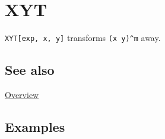 \documentclass[../FeynCalcManual.tex]{subfiles}
\begin{document}
\hypertarget{xyt}{%
\section{XYT}\label{xyt}}

\texttt{XYT[\allowbreak{}exp,\ \allowbreak{}x,\ \allowbreak{}y]}
transforms \texttt{(x y)^m} away.

\subsection{See also}

\hyperlink{toc}{Overview}

\subsection{Examples}
\end{document}

